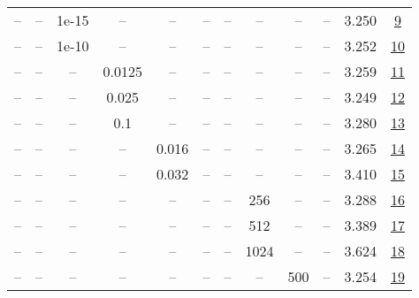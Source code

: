 \begin{table}[H]
\begin{tabular}{cccccccccccc}
-- & -- & 1e-15 & -- & -- & -- & -- & -- & -- & -- & 3.250 & \href{https://wandb.ai/stanford-mercury/optimizer-scaling/runs/sweep-300m-6B-mars1653ealr0.008-wd0.1-minlr0-warmup1000-b10.98-b-691b72}{9} \\
-- & -- & 1e-10 & -- & -- & -- & -- & -- & -- & -- & 3.252 & \href{https://wandb.ai/stanford-mercury/optimizer-scaling/runs/sweep-300m-6B-mars47d219lr0.008-wd0.1-minlr0-warmup1000-b10.98-b-193328}{10} \\
-- & -- & -- & 0.0125 & -- & -- & -- & -- & -- & -- & 3.259 & \href{https://wandb.ai/stanford-mercury/optimizer-scaling/runs/sweep-300m-6B-mars4c5abflr0.008-wd0.1-minlr0-warmup1000-b10.98-b-3e054b}{11} \\
-- & -- & -- & 0.025 & -- & -- & -- & -- & -- & -- & 3.249 & \href{https://wandb.ai/stanford-mercury/optimizer-scaling/runs/sweep-300m-6B-marsad66b2lr0.008-wd0.1-minlr0-warmup1000-b10.98-b-16d73c}{12} \\
-- & -- & -- & 0.1 & -- & -- & -- & -- & -- & -- & 3.280 & \href{https://wandb.ai/stanford-mercury/optimizer-scaling/runs/sweep-300m-6B-mars64d862lr0.008-wd0.1-minlr0-warmup1000-b10.98-b-546935}{13} \\
-- & -- & -- & -- & 0.016 & -- & -- & -- & -- & -- & 3.265 & \href{https://wandb.ai/stanford-mercury/optimizer-scaling/runs/sweep-300m-6B-marsdf5e3elr0.016-wd0.1-minlr0-warmup1000-b10.98-b-7afb74}{14} \\
-- & -- & -- & -- & 0.032 & -- & -- & -- & -- & -- & 3.410 & \href{https://wandb.ai/stanford-mercury/optimizer-scaling/runs/sweep-300m-6B-mars9fd6a9lr0.032-wd0.1-minlr0-warmup1000-b10.98-b-c5ffe2}{15} \\
-- & -- & -- & -- & -- & -- & -- & 256 & -- & -- & 3.288 & \href{https://wandb.ai/stanford-mercury/optimizer-scaling/runs/sweep-300m-6B-mars39cccclr0.008-wd0.1-minlr0-warmup1000-b10.98-b-2e238d}{16} \\
-- & -- & -- & -- & -- & -- & -- & 512 & -- & -- & 3.389 & \href{https://wandb.ai/stanford-mercury/optimizer-scaling/runs/sweep-300m-6B-mars4f583elr0.008-wd0.1-minlr0-warmup1000-b10.98-b-10ec54}{17} \\
-- & -- & -- & -- & -- & -- & -- & 1024 & -- & -- & 3.624 & \href{https://wandb.ai/stanford-mercury/optimizer-scaling/runs/sweep-300m-6B-marsfd212alr0.008-wd0.1-minlr0-warmup1000-b10.98-b-5c0926}{18} \\
-- & -- & -- & -- & -- & -- & -- & -- & 500 & -- & 3.254 & \href{https://wandb.ai/stanford-mercury/optimizer-scaling/runs/sweep-300m-6B-marsc7a1edlr0.008-wd0.1-minlr0-warmup500-b10.98-b2-3ac9c1}{19} \\

\end{tabular}
\end{table}
